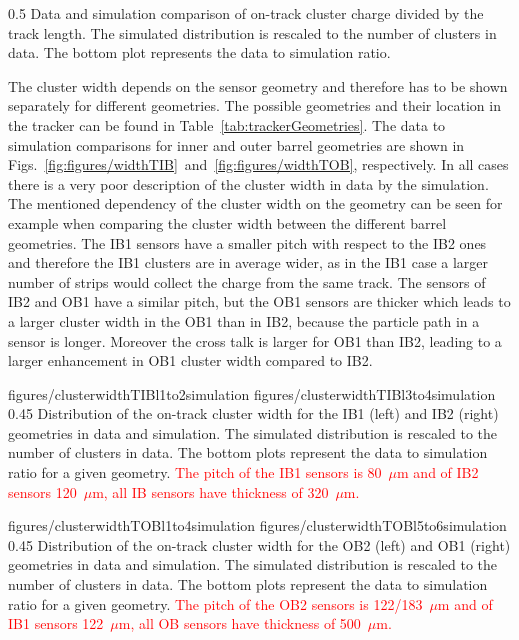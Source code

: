                  {0.5}       %
                 { Data and simulation comparison of on-track cluster charge divided by the track length. The simulated distribution is rescaled to the number of clusters in data. The bottom plot represents the data to simulation ratio. }

The cluster width depends on the sensor geometry and therefore has to be shown separately for different geometries. The possible geometries and their location in the tracker can be found in Table~\ref{tab:trackerGeometries}. The data to simulation comparisons for inner and outer barrel geometries are shown in Figs.~\ref{fig:figures/widthTIB}~and~\ref{fig:figures/widthTOB}, respectively. In all cases there is a very poor description of the cluster width in data by the simulation. The mentioned dependency of the cluster width on the geometry can be seen for example when comparing the cluster width between the different barrel geometries. The IB1 sensors have a smaller pitch with respect to the IB2 ones and therefore the IB1 clusters are in average wider, as in the IB1 case a larger number of strips would collect the charge from the same track. The sensors of IB2 and OB1 have a similar pitch, but the OB1 sensors are thicker which leads to a larger cluster width in the OB1 than in IB2, because the particle path in a sensor is longer. Moreover the cross talk is larger for OB1 than IB2, leading to a larger enhancement in OB1 cluster width compared to IB2.


                 {figures/clusterwidthTIBl1to2simulation}
                 {figures/clusterwidthTIBl3to4simulation} %
                 {0.45}       %
                 { Distribution of the on-track cluster width for the IB1 (left) and IB2 (right) geometries in data and simulation. The simulated distribution is rescaled to the number of clusters in data. The bottom plots represent the data to simulation ratio for a given geometry. \textcolor{red}{The pitch of the IB1 sensors is 80~$\mu$m and of IB2 sensors 120~$\mu$m, all IB sensors have thickness of 320~$\mu$m. } }

                 {figures/clusterwidthTOBl1to4simulation}
                 {figures/clusterwidthTOBl5to6simulation} %
                 {0.45}       %
                 { Distribution of the on-track cluster width for the OB2 (left) and OB1 (right) geometries in data and simulation. The simulated distribution is rescaled to the number of clusters in data. The bottom plots represent the data to simulation ratio for a given geometry. \textcolor{red}{The pitch of the OB2 sensors is 122/183~$\mu$m and of IB1 sensors 122~$\mu$m, all OB sensors have thickness of 500~$\mu$m. }}


